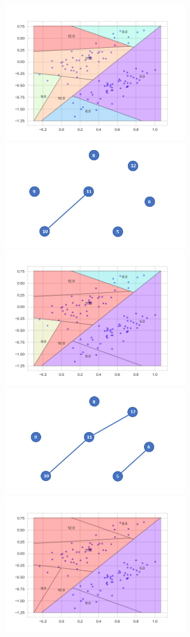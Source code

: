 \documentclass[a4paper]{article}
\begin{document}
\begin{figure}[H]
        \centering
        \includegraphics[width=8cm]{grafici/2blobs_4_6.png}      
        \includegraphics[width=8cm]{grafici/2blobs_4_6_G.png}      
        \includegraphics[width=8cm]{grafici/2blobs_4_4.png}      
        \includegraphics[width=8cm]{grafici/2blobs_4_4_G.png}      
        \includegraphics[width=8cm]{grafici/2blobs_4_2.png}      

\end{figure}
\end{document}
